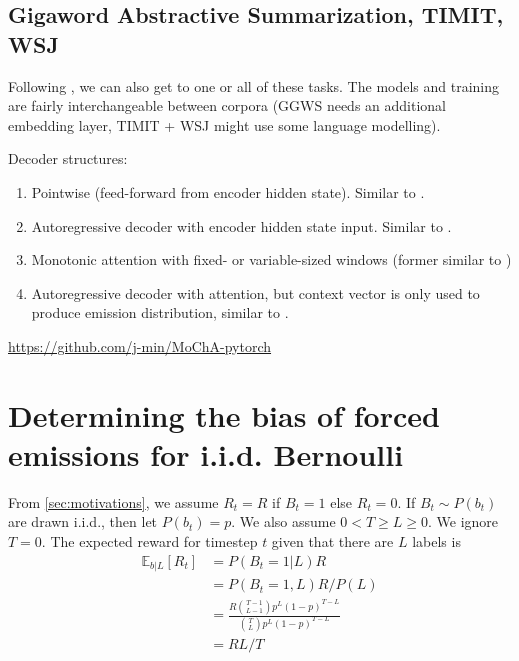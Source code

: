 \documentclass{article}
\begin{document}
\subsection{Gigaword Abstractive Summarization, TIMIT, WSJ}

Following \citet{raffelOnlineLineartimeAttention2017}, we can also get to
one or all of these tasks. The models and training are fairly interchangeable
between corpora (GGWS needs an additional embedding layer, TIMIT + WSJ might
use some language modelling).

Decoder structures:
%
\begin{enumerate}
    \item Pointwise (feed-forward from encoder hidden state). Similar to
          \citet{luoLearningOnlineAlignments2017,lawsonLearningHardAlignments2018}.
    \item Autoregressive decoder with encoder hidden state input. Similar to
          \citet{raffelOnlineLineartimeAttention2017}.
    \item Monotonic attention with fixed- or variable-sized windows
          (former similar to \citet{chiuMonotonicChunkwiseAttention2018})
    \item Autoregressive decoder with attention, but context vector is only
          used to produce emission distribution, similar to
          \citet{wuHardNonmonotonicAttention2018,wuExactHardMonotonic2019}.
\end{enumerate}
%

\url{https://github.com/j-min/MoChA-pytorch}




\appendix

\section{Determining the bias of forced emissions for i.i.d. Bernoulli}
\label{sec:suffix}

From \cref{sec:motivations}, we assume $R_t = R$ if $B_t = 1$ else $R_t = 0$.
If $B_t \sim P(b_t)$ are drawn i.i.d., then let $P(b_t) = p$. We also assume $0
< T \geq L \geq 0$. We ignore $T = 0$. The expected reward for timestep $t$
given that there are $L$ labels is
%
\begin{equation} \label{eq:iid_unbiased}
\begin{split}
    \mathbb{E}_{b|L}[R_t]
        &= P(B_t=1|L)R \\
        &= P(B_t=1, L) R / P(L) \\
        &= \frac{R\binom{T - 1}{L - 1} p^L (1 - p)^{T - L}}
                {\binom{T}{L}p^L (1 - p)^{T - L}} \\
        &= RL / T
\end{split}
\end{equation}
\end{document}
